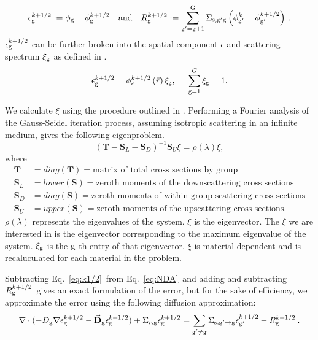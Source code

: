   \begin{equation}
  \epsilon_{\mathrm{g}}^{k+1/2} := \phi_{\mathrm{g}} - \phi_{\mathrm{g}}^{k + 1/2} \quad \mathrm{and} \quad R_{\mathrm{g}}^{k+1/2} := \sum\limits_{\mathrm{g}'=\mathrm{g}+1}^{\mathrm{G}} \Sigma_{\mathrm{s},\mathrm{g}' \mathrm{g}}\left(\phi_{\mathrm{g}'}^k - \phi_{\mathrm{g}'}^{k + 1/2}\right)\:.
  \end{equation}
  $\epsilon_{\mathrm{g}}^{k + 1/2}$ can be further broken into the spatial component $\epsilon$ and scattering spectrum $\xi_{\mathrm{g}}$ as defined in \cite{morel-upscat,evans-upscat}.
  \begin{equation}
  \epsilon_{\mathrm{g}}^{k+1/2} = \phi_{\epsilon}^{k+1/2}\left(\vec{r}\right)\xi_{\mathrm{g}}, \hspace{5mm} \sum\limits_{\mathrm{g}=1}^G \xi_{\mathrm{g}} = 1.
  \end{equation}
  
  We calculate $\xi$ using the procedure outlined in \cite{evans-upscat}. Performing a Fourier analysis of the Gauss-Seidel iteration process, assuming isotropic scattering in an infinite medium, gives the following eigenproblem. 
  \begin{equation}
      (\textbf{T} - \textbf{S}_L - \textbf{S}_D)^{-1}\textbf{S}_U \xi = \rho(\lambda)\xi,
    \label{eq:eigenvector}
  \end{equation}
  where
  \begin{align*}
      \textbf{T} &= diag(\textbf{T}) =  \text{matrix of total cross sections by group} \\
      \textbf{S}_L &= lower(\textbf{S}) = \text{zeroth moments of the downscattering cross sections} \\
      \textbf{S}_D &= diag(\textbf{S}) = \text{zeroth moments of within group scattering cross sections} \\
      \textbf{S}_U &= upper(\textbf{S}) = \text{zeroth moments of the upscattering cross sections.}
  \end{align*}
  $\rho(\lambda)$ represents the eigenvalues of the system. $\xi$ is the eigenvector. The $\xi$ we are interested in is the eigenvector corresponding to the maximum eigenvalue of the system. $\xi_{\mathrm{g}}$ is the $\mathrm{g}$-th entry of that eigenvector. $\xi$ is material dependent and is recaluculated for each material in the problem.
  \par
  Subtracting Eq.\ \eqref{eq:k1/2}\ from Eq.\ \eqref{eq:NDA}\ and adding and subtracting $R_{\mathrm{g}}^{k+1/2}$\ gives an exact formulation of the error, but for the sake of efficiency, we approximate the error using the following diffusion approximation:
  \begin{equation}
  \nabla\cdot(-D_{\mathrm{g}}  \nabla \epsilon_{\mathrm{g}}^{k+1/2} - \vec{\bf D}_{\mathrm{g}}
  \epsilon_{\mathrm{g}}^{k+1/2}) + \Sigma_{r,\mathrm{g}}  \epsilon_{\mathrm{g}}^{k+1/2} =  \sum\limits_{\substack{{\mathrm{g}'}\neq\mathrm{g}}} \Sigma_{\mathrm{s},\mathrm{g}' \to\mathrm{g}}  \epsilon_{\mathrm{g}'}^{k+1/2} -  R^{k+1/2}_{\mathrm{g}} \:.
  \end{equation}
